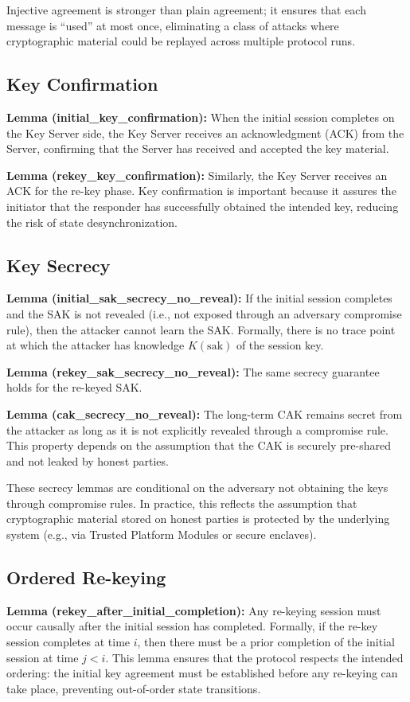 \documentclass{llncs}
\begin{document}
Injective agreement is stronger than plain agreement; it ensures that each message is ``used'' at most once, eliminating a class of attacks where cryptographic material could be replayed across multiple protocol runs.

\subsection{Key Confirmation}
\textbf{Lemma (initial\_key\_confirmation):} When the initial session completes on the Key Server side, the Key Server receives an acknowledgment (ACK) from the Server, confirming that the Server has received and accepted the key material.

\textbf{Lemma (rekey\_key\_confirmation):} Similarly, the Key Server receives an ACK for the re-key phase. Key confirmation is important because it assures the initiator that the responder has successfully obtained the intended key, reducing the risk of state desynchronization.

\subsection{Key Secrecy}
\textbf{Lemma (initial\_sak\_secrecy\_no\_reveal):} If the initial session completes and the SAK is not revealed (i.e., not exposed through an adversary compromise rule), then the attacker cannot learn the SAK. Formally, there is no trace point at which the attacker has knowledge $K(\text{sak})$ of the session key.

\textbf{Lemma (rekey\_sak\_secrecy\_no\_reveal):} The same secrecy guarantee holds for the re-keyed SAK.

\textbf{Lemma (cak\_secrecy\_no\_reveal):} The long-term CAK remains secret from the attacker as long as it is not explicitly revealed through a compromise rule. This property depends on the assumption that the CAK is securely pre-shared and not leaked by honest parties.

These secrecy lemmas are conditional on the adversary not obtaining the keys through compromise rules. In practice, this reflects the assumption that cryptographic material stored on honest parties is protected by the underlying system (e.g., via Trusted Platform Modules or secure enclaves).

\subsection{Ordered Re-keying}
\textbf{Lemma (rekey\_after\_initial\_completion):} Any re-keying session must occur causally after the initial session has completed. Formally, if the re-key session completes at time $i$, then there must be a prior completion of the initial session at time $j < i$. This lemma ensures that the protocol respects the intended ordering: the initial key agreement must be established before any re-keying can take place, preventing out-of-order state transitions.
\end{document}
